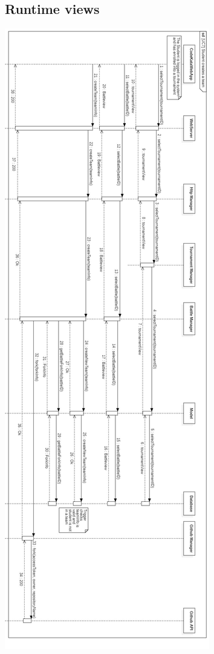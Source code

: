\documentclass{article}
\begin{document}
\subsection{Runtime views}
\begin{center}
    \includegraphics[angle=90,width=0.4\linewidth]{uc7.jpg}
  \label{fig:uc7}
\end{center}
\end{document}
